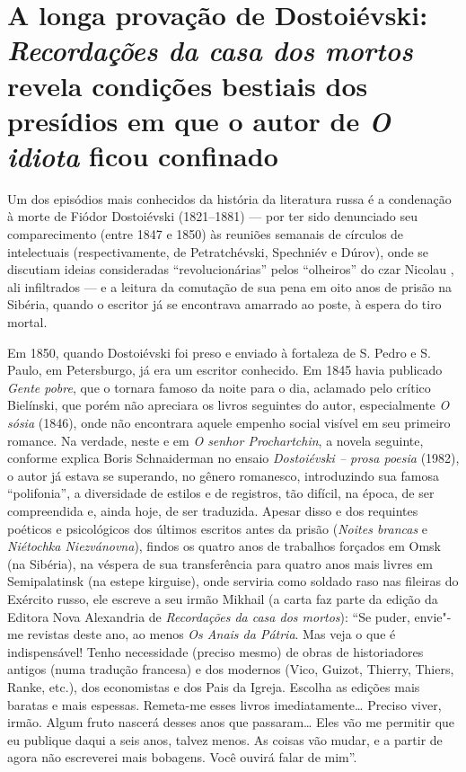 \chapter*{A longa provação de Dostoiévski: \emph{Recordações da casa dos mortos} revela condições bestiais dos presídios em que o autor de \emph{O idiota} ficou confinado}



Um dos episódios mais conhecidos da história da literatura russa é a
condenação à morte de Fiódor Dostoiévski (1821--1881) --- por ter sido
denunciado seu comparecimento (entre 1847 e 1850) às reuniões semanais
de círculos de intelectuais (respectivamente, de Petratchévski,
Spechniév e Dúrov), onde se discutiam ideias consideradas
``revolucionárias'' pelos ``olheiros'' do czar Nicolau , ali
infiltrados --- e a leitura da comutação de sua pena em oito anos de
prisão na Sibéria, quando o escritor já se encontrava amarrado ao poste,
à espera do tiro mortal.

Em 1850, quando Dostoiévski foi preso e enviado à fortaleza de S. Pedro
e S. Paulo, em Petersburgo, já era um escritor conhecido. Em 1845 havia
publicado \emph{Gente pobre}, que o tornara famoso da noite para o dia,
aclamado pelo crítico Bielínski, que porém não apreciara os livros
seguintes do autor, especialmente \emph{O sósia} (1846), onde não
encontrara aquele empenho social visível em seu primeiro romance. Na
verdade, neste e em \emph{O senhor Prochartchin}, a novela seguinte,
conforme explica Boris Schnaiderman no ensaio \emph{Dostoiévski -- prosa
poesia} (1982), o autor já estava se superando, no gênero romanesco,
introduzindo sua famosa ``polifonia'', a diversidade de estilos e de
registros, tão difícil, na época, de ser compreendida e, ainda hoje, de
ser traduzida. Apesar disso e dos requintes poéticos e psicológicos dos
últimos escritos antes da prisão (\emph{Noites brancas} e \emph{Niétochka
Niezvánovna}), findos os quatro anos de trabalhos forçados em Omsk (na
Sibéria), na véspera de sua transferência para quatro anos mais livres
em Semipalatinsk (na estepe kirguise), onde serviria como soldado raso
nas fileiras do Exército russo, ele escreve a seu irmão Mikhail (a carta
faz parte da edição da Editora Nova Alexandria de \emph{Recordações da
casa dos mortos}): ``Se puder, envie"-me revistas deste ano, ao menos
\emph{Os Anais da Pátria}. Mas veja o que é indispensável! Tenho
necessidade (preciso mesmo) de obras de historiadores antigos (numa
tradução francesa) e dos modernos (Vico, Guizot, Thierry, Thiers, Ranke,
etc.), dos economistas e dos Pais da Igreja. Escolha as edições mais
baratas e mais espessas. Remeta-me esses livros imediatamente\ldots{} Preciso
viver, irmão. Algum fruto nascerá desses anos que passaram\ldots{} Eles vão
me permitir que eu publique daqui a seis anos, talvez menos. As coisas
vão mudar, e a partir de agora não escreverei mais bobagens. Você ouvirá
falar de mim''. 

